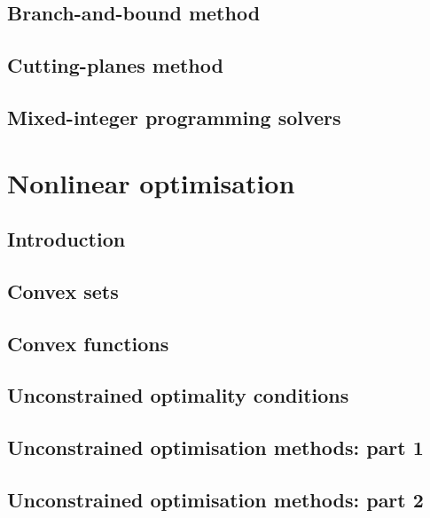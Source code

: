 \documentclass{bookest}
\begin{document}
	\chapter{Branch-and-bound method} \label{chapter_9}
	
	
	\chapter{Cutting-planes method} \label{chapter_10}
	
	
	\chapter{Mixed-integer programming solvers} \label{chapter_11}
	
		
	\part{Nonlinear optimisation} \label{part_2}
		
	\chapter{Introduction}
	
	
	\chapter{Convex sets}
	
	
	\chapter{Convex functions}
	
	
	\chapter{Unconstrained optimality conditions}
	
	
	\chapter{Unconstrained optimisation methods: part 1}
	
	
	\chapter{Unconstrained optimisation methods: part 2}
	
	
\end{document}
